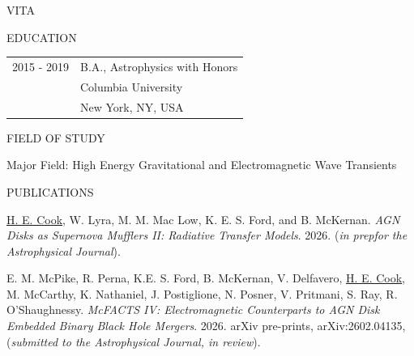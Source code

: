 \begin{center}
 VITA
\end{center}

\medskip

\begin{center}
EDUCATION
\end{center}


\begin{flushleft}
\begin{tabular}{ll}
 
2015 - 2019 &  B.A., Astrophysics with Honors \\
 & Columbia University \\
 & New York, NY, USA
\end{tabular}
\end{flushleft}

\medskip

\singlespace

\medskip

\begin{center}
FIELD OF STUDY
\end{center}
\begin{flushleft}
Major Field: High Energy Gravitational and Electromagnetic Wave Transients
\end{flushleft}

\begin{center}
PUBLICATIONS %
\end{center}

\hangindent=0.5in \noindent \underline{H. E. Cook}, W. Lyra, M. M. Mac Low, K. E. S. Ford, and B. McKernan. \textit{AGN Disks as Supernova Mufflers II: Radiative Transfer Models}. 2026. (\textit{in prepfor the Astrophysical Journal}).

\hangindent=0.5in \noindent E. M. McPike, R. Perna, K.E. S. Ford, B. McKernan, V. Delfavero, \underline{H. E. Cook}, M. McCarthy, K. Nathaniel, J. Postiglione, N. Posner, V. Pritmani, S. Ray, R. O'Shaughnessy. \textit{McFACTS IV: Electromagnetic Counterparts to AGN Disk Embedded Binary Black Hole Mergers}. 2026. arXiv pre-prints, arXiv:2602.04135, (\textit{submitted to the Astrophysical Journal, in review}).

